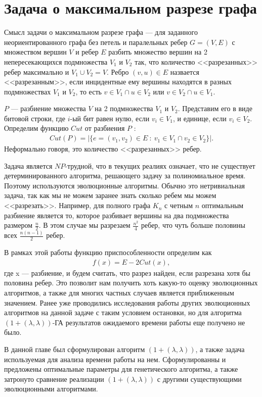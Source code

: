 \documentclass[times]{itmo-student-thesis}
\newcommand{\alglambda}{${(1 + (\lambda , \lambda))}$\xspace}
\newcommand{\alglambdaf}{${(1 + (\lambda , \lambda))}$-ГА\xspace}
\begin{document}
\section{Задача о максимальном разрезе графа}

Смысл задачи о максимальном разрезе графа --- для заданного неориентированного графа без петель и паралельных ребер $G = (V, E)$ с множеством вершин $V$ и ребер $E$ разбить множество вершин на 2 непересекающихся подмножества $V_1$ и $V_2$ так, что количество <<разрезанных>> ребер максимально и $V_1 \cup V_2 = V$.
Ребро $(v, u) \in E$ назвается <<разрезанным>>, если инцидентные ему вершины находятся в разных подмножествах $V_1$ и $V_2$, то есть $v \in V_1 \cap u \in V_2$ или $v \in V_2 \cap u \in V_1$.

$P$ --- разбиение множества $V$ на 2 подмножества $V_1$ и $V_2$.
Представим его в виде битовой строки, где $i$-ый бит равен нулю, если $v_i \in V_1$, и единице, если $v_i \in V_2$.
Определим функцию  $Cut$ от разбиения $P$ :
\begin{align*}
   Cut(P) = |\{e = (v_1, v_2) \in E ~:~ v_1 \in V_1 \cap v_2 \in V_2\}|.
\end{align*}
Неформально говоря, это количество <<разрезанных>> ребер.

Задача является $NP$-трудной, что в текущих реалиях означает, что не существует детерминированного алгоритма, решающего задачу за полиномиальное время. Поэтому используются эволюционные алгоритмы.
Обычно это нетривиальная задача, так как мы не можем заранее знать сколько ребем мы можем <<разрезать>>. Например, для полного графа $K_n$ с четным $n$ оптимальным разбиение является то, которое разбивает вершины на два подмножества размером $\frac{n}{2}$. В этом случае мы разрезаем $\frac{n^2}{4}$ ребер, что чуть больше половины всех $\frac{n(n-1)}{2}$ ребер.

В рамках этой работы функцию приспособленности определим как
\begin{align*}
   f(x) = E - 2Cut(x),
\end{align*}
где x --- разбиение, и будем считать, что разрез найден, если разрезана хотя бы половина ребер.
Это позволит нам получить хоть какую-то оценку эволюционных алгоритмов, а также для многих частных случаев является приближенным значением. Ранее уже проводились исследования работы других эволюционных алгоритмов на данной задаче с таким условием остановки, но для алгоритма \alglambdaf результатов ожидаемого времени работы еще получено не было.

\chapterconclusion
В данной главе был сформулирован алгоритм \alglambda, а также задача используемая для анализа времени работы на нем. Сформулированны и предложены оптимальные параметры для генетического алгоритма, а также затронуто сравнение реализации \alglambda с другими существующими эволюционными алгоритмами.
\end{document}
